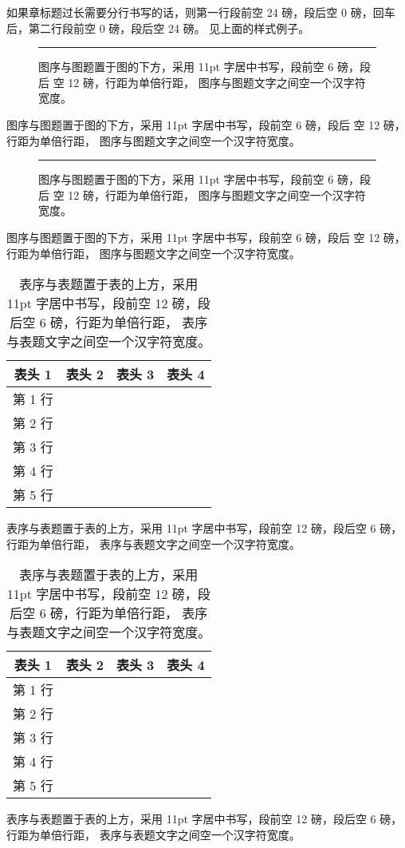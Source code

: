 \documentclass[degree=doctor]{thuthesis}
\begin{document}
如果章标题过长需要分行书写的话，则第一行段前空 24 磅，段后空 0 磅，回车后，第二行段前空 0 磅，段后空 24 磅。
见上面的样式例子。



\clearpage

\newcommand\dummy{%
  图序与图题置于图的下方，采用 11pt 字居中书写，段前空 6 磅，段后 空 12 磅，行距为单倍行距，
  图序与图题文字之间空一个汉字符宽度。
}

\begin{figure}[t]
  \centering
  \rule{1cm}{1cm}
  \caption{\dummy}
\end{figure}

\dummy

\begin{figure}[h]
  \centering
  \rule{1cm}{1cm}
  \caption{\dummy}
\end{figure}

\dummy
\clearpage


\renewcommand\dummy{%
  表序与表题置于表的上方，采用 11pt 字居中书写，段前空 12 磅，段后空 6 磅，行距为单倍行距，
  表序与表题文字之间空一个汉字符宽度。
}

\begin{table}[t]
  \centering
  \caption{\dummy}
  \begin{tabular}{cccc}
    \toprule
    表头 1 & 表头 2 & 表头 3 & 表头 4 \\
    \midrule
    第 1 行 & & & \\
    第 2 行 & & & \\
    第 3 行 & & & \\
    第 4 行 & & & \\
    第 5 行 & & & \\
    \bottomrule
  \end{tabular}
\end{table}

\dummy

\begin{table}[h]
  \centering
  \caption{\dummy}
  \begin{tabular}{cccc}
    \toprule
    表头 1 & 表头 2 & 表头 3 & 表头 4 \\
    \midrule
    第 1 行 & & & \\
    第 2 行 & & & \\
    第 3 行 & & & \\
    第 4 行 & & & \\
    第 5 行 & & & \\
    \bottomrule
  \end{tabular}
\end{table}

\dummy



\clearpage
\OMIT
\end{document}
